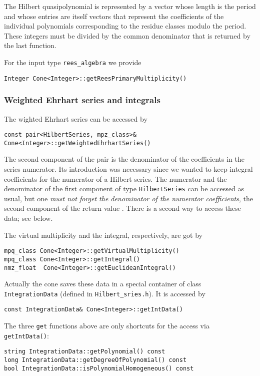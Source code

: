 \documentclass[12pt,a4paper]{scrartcl}
\theoremstyle{definition}
\begin{document}
\begin{small}
The Hilbert quasipolynomial is represented by a vector whose length is the period and whose entries are itself vectors that represent the coefficients of the individual polynomials corresponding to the residue classes modulo the period. These integers must be divided by the common denominator that is returned by the last function.

For the input type \verb|rees_algebra| we provide
\begin{Verbatim}
Integer Cone<Integer>::getReesPrimaryMultiplicity()
\end{Verbatim}

\subsubsection{Weighted Ehrhart series and integrals}

The wighted Ehrhart series can be accessed by
\begin{Verbatim}
const pair<HilbertSeries, mpz_class>& Cone<Integer>::getWeightedEhrhartSeries()
\end{Verbatim}
The second component of the pair is the denominator of the coefficients in the series numerator. Its introduction was necessary since we wanted to keep integral coefficients for the numerator of a Hilbert series. The numerator and the denominator of the first component of type \verb|HilbertSeries| can be accessed as usual, but one \emph{must not forget the denominator of the numerator coefficients}, the second component of the return value . There is a second way to access these data; see below.

The virtual multiplicity and the integral, respectively, are got by
\begin{Verbatim}
mpq_class Cone<Integer>::getVirtualMultiplicity()
mpq_class Cone<Integer>::getIntegral()
nmz_float  Cone<Integer>::getEuclideanIntegral()
\end{Verbatim}

Actually the cone saves these data in a special container of class \verb|IntegrationData| (defined in \verb|Hilbert_sries.h|). It is accessed by
\begin{Verbatim}
const IntegrationData& Cone<Integer>::getIntData()
\end{Verbatim}
The three \verb|get| functions above are only shortcuts for the access via \verb|getIntData()|:
\begin{Verbatim}
string IntegrationData::getPolynomial() const
long IntegrationData::getDegreeOfPolynomial() const
bool IntegrationData::isPolynomialHomogeneous() const


\end{Verbatim}
\end{small}
\end{document}

